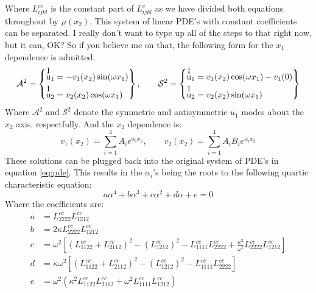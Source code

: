 \documentclass[11pt]{article}
\begin{document}
Where $L^{cc}_{ijkl}$ is the constant part of $L^{c}_{ijkl}$ as we have divided both equations throughout by $\mu(x_2)$.
This system of linear PDE's with constant coefficients can be separated. I really don't want to type up all of the steps to that right now, but it can, OK? So if you believe me on that, the following form for the $x_1$ dependence is admitted.
\begin{equation}
\mathcal{A}^2 = 
\left \{ 
\begin{aligned} 
  \stackon{u}{1}_1 &= -v_1(x_2)\sin(\omega x_1) \\
  \stackon{u}{1}_2 &=  v_2(x_2)\cos(\omega x_1)
\end{aligned} 
\right \} , \qquad
\mathcal{S}^2 = 
\left \{ 
\begin{aligned} 
  \stackon{u}{1}_1 &= v_1(x_2)\cos(\omega x_1) - v_1(0) \\
  \stackon{u}{1}_2 &=  v_2(x_2)\sin(\omega x_1)
\end{aligned} 
\right \}
\end{equation}
Where $\mathcal{A}^2$ and $\mathcal{S}^2$ denote the symmetric and antisymmetric $u_1$ modes about the $x_2$ axis, respectfully. And the $x_2$ dependence is:
\begin{equation}
v_1(x_2) = \sum_{i = 1}^{4}A_ie^{\alpha_i x_2}, \qquad v_2(x_2) = \sum_{i = 1}^{4} A_i B_i e^{\alpha_i x_2}
\end{equation} 
These solutions can be plugged back into the original system of PDE's in equation \ref{eq:pde}. This results in the $\alpha_i$'s being the roots to the following quartic characteristic equation:
\begin{equation} \label{eq:characteristic}
a\alpha^4 + b\alpha^3 + c\alpha^2 + d\alpha + e = 0
\end{equation}
Where the coefficients are:
\begin{equation*}
\begin{aligned}
  a &= L^{cc}_{2222}L^{cc}_{1212} \\
  b &= 2\kappa L^{cc}_{2222}L^{cc}_{1212} \\
  c &= \omega^2 \left[ \left ( L^{cc}_{1122} + L^{cc}_{2112}\right )^2 - \left ( L^{cc}_{1212} \right )^2 - L^{cc}_{1111}L^{cc}_{2222} + \frac{\kappa^2}{\omega^2}L^{cc}_{2222}L^{cc}_{1212}    \right ] \\
  d &= \kappa \omega^2 \left[ \left ( L^{cc}_{1122} + L^{cc}_{2112}\right )^2 - \left ( L^{cc}_{1212} \right )^2 - L^{cc}_{1111}L^{cc}_{2222} \right ] \\
  e &= \omega^2 \left( \kappa^2 L^{cc}_{1122}L^{cc}_{2112} + \omega^2 L^{cc}_{1111}L^{cc}_{1212} \right)   
\end{aligned}
\end{equation*}
\end{document}
